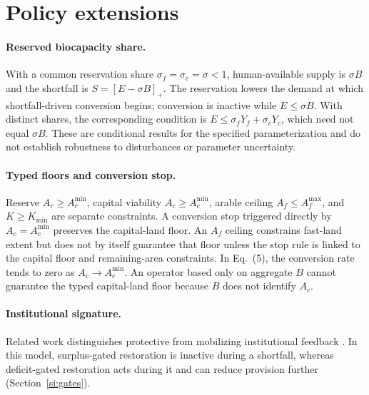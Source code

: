 \documentclass[11pt,a4paper]{article}
\newcommand{\Acmin}{A_c^{\min}}
\begin{document}
\section{Policy extensions}\label{si:policy}

\paragraph{Reserved biocapacity share.} With a common reservation share $\sigma_f=\sigma_c=\sigma<1$, human-available supply is $\sigma B$ and the shortfall is $S=[E-\sigma B]_+$. The reservation lowers the demand at which shortfall-driven conversion begins; conversion is inactive while $E\le\sigma B$. With distinct shares, the corresponding condition is $E\le\sigma_fY_f+\sigma_cY_c$, which need not equal $\sigma B$. These are conditional results for the specified parameterization and do not establish robustness to disturbances or parameter uncertainty.

\paragraph{Typed floors and conversion stop.} Reserve $A_r\ge A_r^{\min}$, capital viability $A_c\ge\Acmin$, arable ceiling $A_f\le A_f^{\max}$, and $K\ge K_{\min}$ are separate constraints. A conversion stop triggered directly by $A_c=\Acmin$ preserves the capital-land floor. An $A_f$ ceiling constrains fast-land extent but does not by itself guarantee that floor unless the stop rule is linked to the capital floor and remaining-area constraints. In Eq.~(5), the conversion rate tends to zero as $A_c\to\Acmin$. An operator based only on aggregate $B$ cannot guarantee the typed capital-land floor because $B$ does not identify $A_c$.

\paragraph{Institutional signature.} Related work distinguishes protective from mobilizing institutional feedback \citep{Abaee2026a}. In this model, surplus-gated restoration is inactive during a shortfall, whereas deficit-gated restoration acts during it and can reduce provision further (Section~\ref{si:gates}).
\end{document}
